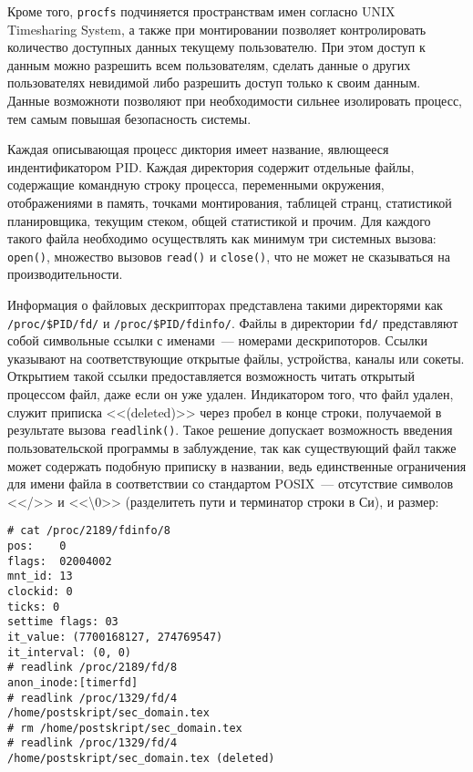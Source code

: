 Кроме того, \texttt{procfs} подчиняется пространствам имен согласно UNIX
Timesharing System, а также при монтировании позволяет контролировать количество
доступных данных текущему пользователю. При этом доступ к данным можно разрешить
всем пользователям, сделать данные о других пользователях невидимой либо
разрешить доступ только к своим данным. Данные возможноти позволяют при
необходимости сильнее изолировать процесс, тем самым повышая безопасность
системы.

Каждая описывающая процесс диктория имеет название, явлющееся индентификатором
PID\cite{understanding}. Каждая директория содержит отдельные файлы, содержащие
командную строку 
процесса, переменными окружения, отображениями в память, точками монтирования,
таблицей странц, статистикой планировщика, текущим стеком, общей статистикой и
прочим. Для каждого такого файла необходимо осуществлять как минимум три
системных вызова: \texttt{open()}, множество вызовов \texttt{read()} и
\texttt{close()}, что не может не сказываться на производительности.

Информация о файловых дескрипторах представлена такими директорями как
\texttt{/proc/\$PID/fd/} и \texttt{/proc/\$PID/fdinfo/}. Файлы в директории
\texttt{fd/} представляют собой символьные ссылки с именами~---
номерами дескрипоторов. Ссылки указывают на соответствующие открытые файлы,
устройства, каналы или сокеты. Открытием такой ссылки предоставляется
возможность читать открытый процессом файл, даже если он уже удален. Индикатором
того, что файл удален, служит приписка <<(deleted)>> через пробел в конце
строки, получаемой в результате вызова \texttt{readlink()}. Такое решение
допускает возможность введения пользовательской программы в
заблуждение\cite{johnson}, так как
существующий файл также может содержать подобную приписку в названии, ведь
единственные ограничения для имени файла в соответствии со стандартом POSIX~---
отсутствие символов <</>> и <<\textbackslash0>> (разделитеть пути и терминатор
строки в Си), и размер:

\medskip
\begin{lstlisting}[style=cstyle]
# cat /proc/2189/fdinfo/8
pos:    0
flags:  02004002
mnt_id: 13
clockid: 0
ticks: 0
settime flags: 03
it_value: (7700168127, 274769547)
it_interval: (0, 0)
# readlink /proc/2189/fd/8
anon_inode:[timerfd]
# readlink /proc/1329/fd/4
/home/postskript/sec_domain.tex
# rm /home/postskript/sec_domain.tex
# readlink /proc/1329/fd/4
/home/postskript/sec_domain.tex (deleted)
\end{lstlisting}
\medskip

